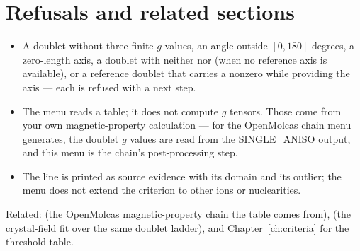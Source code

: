 \section{Refusals and related sections}

\begin{refusalbox}
\begin{itemize}
  \item A doublet without three finite $g$ values, an angle outside
    $[0, 180]$ degrees, a zero-length axis, a doublet with neither
     nor  (when no reference axis is available), or a
    reference doublet that carries a nonzero  while providing the
    axis --- each is refused with a next step.
  \item The menu reads a table; it does not compute $g$ tensors. Those come
    from your own magnetic-property calculation --- for the OpenMolcas chain
    menu~ generates, the doublet $g$ values are read from the
    SINGLE\_ANISO output, and this menu is the chain's post-processing step.
  \item The line is printed as source evidence with its domain and its
    outlier; the menu does not extend the criterion to other ions or
    nuclearities.
\end{itemize}
\end{refusalbox}

Related:  (the OpenMolcas magnetic-property chain the table comes
from),  (the crystal-field fit over the same doublet ladder), and
Chapter~\ref{ch:criteria} for the threshold table.
